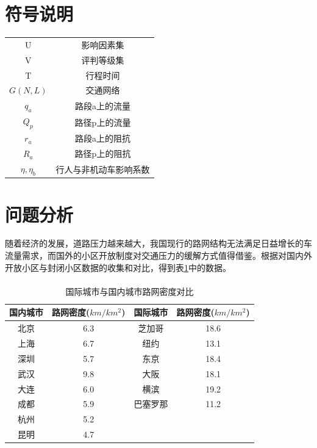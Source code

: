 \documentclass[fontset=fandol,a4paper,12pt]{ctexart}
\newcommand{\upcite}[1]{\textsuperscript{\textsuperscript{\cite{#1}}}}
\begin{document}
  \section{符号说明}
  \begin{tabular}{c|c}
	\toprule[1pt]
	\makebox[0.4\textwidth][c]{符号}	&  \makebox[0.5\textwidth][c]{意义} \\ \hline
	U				&	影响因素集\\
	V				&	评判等级集\\
	T				&	行程时间\\
	$G(N,L)$		&	交通网络\\
	$q_a$			&	路段a上的流量\\
	$Q_p$			&	路径p上的流量\\
	$r_a$			&	路段a上的阻抗\\
	$R_a$			&	路径p上的阻抗\\
	$\eta,\eta_b$	&	行人与非机动车影响系数\\
	\bottomrule[1pt]
\end{tabular}

  \section{问题分析}
  随着经济的发展，道路压力越来越大，我国现行的路网结构无法满足日益增长的车流量需求，而国外的小区开放制度对交通压力的缓解方式值得借鉴。根据对国内外开放小区与封闭小区数据的收集和对比，得到表\ref{tab:net_density}中的数据。
  \begin{table}[!htbp]
	\centering
	\caption{国际城市与国内城市路网密度对比\upcite{国外街区制是如何完美炼成}}
	\label{tab:net_density}
	\begin{tabular}{cc|cc}
		\toprule[1pt]
		国内城市 & 路网密度($km/km^2$) & 国际城市 & 路网密度($km/km^2$) \\ 
		\hline%
		北京 & 6.3 & 芝加哥 & 18.6 \\ 
		上海 & 6.7 & 纽约 & 13.1 \\ 
		深圳 & 5.7 & 东京 & 18.4 \\ 
		武汉 & 9.8 & 大阪 & 18.1 \\ 
		大连 & 6.0 & 横滨 & 19.2 \\ 
		成都 & 5.9 & 巴塞罗那 & 11.2 \\ 
		杭州 & 5.2 &  &  \\ 
		昆明 & 4.7 &  &  \\ 
		\bottomrule[1pt]
	\end{tabular} 
  \end{table}
  
\end{document}
